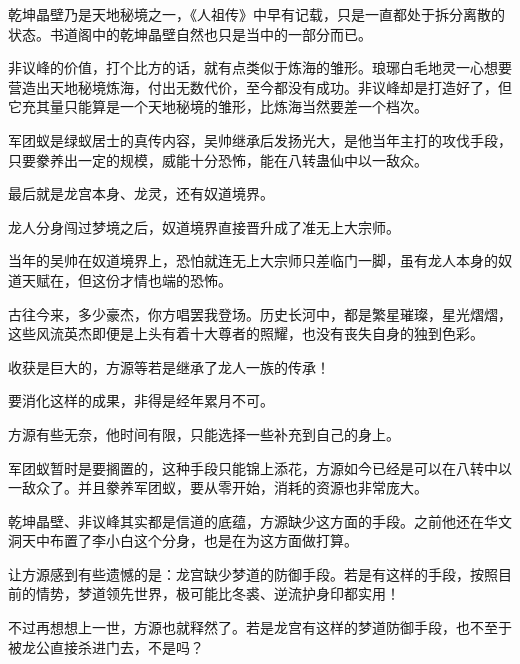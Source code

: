 \begin{this_body}
乾坤晶壁乃是天地秘境之一，《人祖传》中早有记载，只是一直都处于拆分离散的状态。书道阁中的乾坤晶壁自然也只是当中的一部分而已。

非议峰的价值，打个比方的话，就有点类似于炼海的雏形。琅琊白毛地灵一心想要营造出天地秘境炼海，付出无数代价，至今都没有成功。非议峰却是打造好了，但它充其量只能算是一个天地秘境的雏形，比炼海当然要差一个档次。

军团蚁是绿蚁居士的真传内容，吴帅继承后发扬光大，是他当年主打的攻伐手段，只要豢养出一定的规模，威能十分恐怖，能在八转蛊仙中以一敌众。

最后就是龙宫本身、龙灵，还有奴道境界。

龙人分身闯过梦境之后，奴道境界直接晋升成了准无上大宗师。

当年的吴帅在奴道境界上，恐怕就连无上大宗师只差临门一脚，虽有龙人本身的奴道天赋在，但这份才情也端的恐怖。

古往今来，多少豪杰，你方唱罢我登场。历史长河中，都是繁星璀璨，星光熠熠，这些风流英杰即便是上头有着十大尊者的照耀，也没有丧失自身的独到色彩。

收获是巨大的，方源等若是继承了龙人一族的传承！

要消化这样的成果，非得是经年累月不可。

方源有些无奈，他时间有限，只能选择一些补充到自己的身上。

军团蚁暂时是要搁置的，这种手段只能锦上添花，方源如今已经是可以在八转中以一敌众了。并且豢养军团蚁，要从零开始，消耗的资源也非常庞大。

乾坤晶壁、非议峰其实都是信道的底蕴，方源缺少这方面的手段。之前他还在华文洞天中布置了李小白这个分身，也是在为这方面做打算。

让方源感到有些遗憾的是：龙宫缺少梦道的防御手段。若是有这样的手段，按照目前的情势，梦道领先世界，极可能比冬裘、逆流护身印都实用！

不过再想想上一世，方源也就释然了。若是龙宫有这样的梦道防御手段，也不至于被龙公直接杀进门去，不是吗？

\end{this_body}

